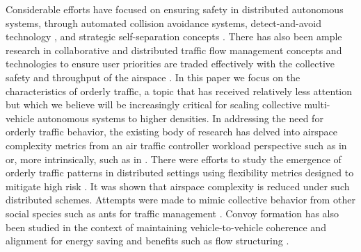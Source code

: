 \documentclass[conference, letter]{IEEEtran}
\begin{document}
Considerable efforts have focused on ensuring safety in distributed autonomous systems, through automated collision avoidance systems, detect-and-avoid technology \cite{btcas}, and strategic self-separation concepts \cite{baop}. There has also been ample research in collaborative and distributed traffic flow management concepts and technologies to ensure user priorities are traded effectively with the collective safety and throughput of the airspace \cite{btasar} \cite{bctfm}. In this paper we focus on the characteristics of orderly traffic, a topic that has received relatively less attention but which we believe will be increasingly critical for scaling collective multi-vehicle autonomous systems to higher densities. In addressing the need for orderly traffic behavior, the existing body of research has delved into airspace complexity metrics from an air traffic controller workload perspective such as in \cite{pk-dyndensity} or, more intrinsically, such as in \cite{delahaye-entropy}. There were efforts to study the emergence of orderly traffic patterns in distributed settings using flexibility metrics designed to mitigate high risk \cite{idris-delahaye} \cite{idrisaviation2011}. It was shown that airspace complexity is reduced under such distributed schemes. Attempts were made to mimic collective behavior from other social species such as ants for traffic management \cite{durant}. Convoy formation has also been studied in the context of maintaining vehicle-to-vehicle coherence and alignment for energy saving and benefits such as flow structuring \cite{ishihara} \cite{Xu}. 

\end{document}
